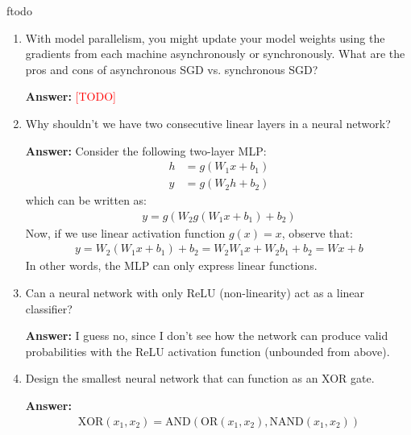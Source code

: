 ƒtodo\documentclass{article}
\newenvironment{QandA}{\begin{enumerate}[label=\arabic*.]}{\end{enumerate}}
\newenvironment{answer}{\par\normalfont \textbf{Answer:}}{}
\newcommand{\todo}{\textcolor{red}{[TODO]}}
\begin{document}
\begin{QandA}
    \item With model parallelism, you might update your model weights using the gradients from each machine asynchronously or synchronously. What are the pros and cons of asynchronous SGD vs. synchronous SGD?
    \begin{answer}
        \todo 
    \end{answer}

    \item Why shouldn’t we have two consecutive linear layers in a neural network?
    \begin{answer}
        Consider the following two-layer MLP:
        \begin{align*}
            h &= g(W_1 x + b_1) \\
            y &= g(W_2 h + b_2)
        \end{align*}
        which can be written as:
        \begin{align*}
            y = g(W_2 g(W_1 x + b_1) + b_2)
        \end{align*}
        Now, if we use linear activation function $g(x) = x$, observe that:
        \begin{align*}
            y = W_2 (W_1 x + b_1) + b_2 = W_2 W_1 x + W_2 b_1 + b_2 = W x + b
        \end{align*}
        In other words, the MLP can only express linear functions. 
    \end{answer}

    \item Can a neural network with only ReLU (non-linearity) act as a linear classifier?
    \begin{answer}
        I guess no, since I don't see how the network can produce valid probabilities with the ReLU activation function (unbounded from above). 
    \end{answer}

    \item Design the smallest neural network that can function as an XOR gate.
    \begin{answer}
        \begin{align*}
            \text{XOR}(x_1, x_2) = \text{AND} \left( \text{OR}(x_1, x_2), \text{NAND}(x_1, x_2) \right)
        \end{align*}
    \end{answer}


\end{QandA}
\end{document}
